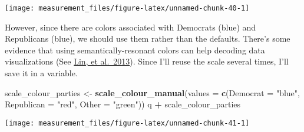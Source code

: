 \documentclass[]{book}
\newenvironment{Shaded}{\begin{snugshade}}{\end{snugshade}}
\newcommand{\CommentTok}[1]{\textcolor[rgb]{0.56,0.35,0.01}{\textit{#1}}}
\newcommand{\DataTypeTok}[1]{\textcolor[rgb]{0.13,0.29,0.53}{#1}}
\newcommand{\DecValTok}[1]{\textcolor[rgb]{0.00,0.00,0.81}{#1}}
\newcommand{\KeywordTok}[1]{\textcolor[rgb]{0.13,0.29,0.53}{\textbf{#1}}}
\newcommand{\NormalTok}[1]{#1}
\newcommand{\OperatorTok}[1]{\textcolor[rgb]{0.81,0.36,0.00}{\textbf{#1}}}
\newcommand{\StringTok}[1]{\textcolor[rgb]{0.31,0.60,0.02}{#1}}
\theoremstyle{definition}
\theoremstyle{definition}
\theoremstyle{definition}
\theoremstyle{remark}
\begin{document}
\begin{center}\texttt{[image: measurement\_files/figure-latex/unnamed-chunk-40-1]} \end{center}

However, since there are colors associated with Democrats (blue) and
Republicans (blue), we should use them rather than the defaults. There's
some evidence that using semantically-resonant colors can help decoding
data visualizations (See
\href{http://vis.stanford.edu/files/2013-SemanticColor-EuroVis.pdf}{Lin,
et al.~2013}). Since I'll reuse the scale several times, I'll save it in
a variable.

\begin{Shaded}
\begin{Highlighting}[]
\NormalTok{scale_colour_parties <-}
\StringTok{  }\KeywordTok{scale_colour_manual}\NormalTok{(}\DataTypeTok{values =} \KeywordTok{c}\NormalTok{(}\DataTypeTok{Democrat =} \StringTok{"blue"}\NormalTok{,}
                                 \DataTypeTok{Republican =} \StringTok{"red"}\NormalTok{,}
                                 \DataTypeTok{Other =} \StringTok{"green"}\NormalTok{))}
\NormalTok{q }\OperatorTok{+}\StringTok{ }\NormalTok{scale_colour_parties}
\end{Highlighting}
\end{Shaded}

\begin{center}\texttt{[image: measurement\_files/figure-latex/unnamed-chunk-41-1]} \end{center}

\begin{Shaded}
\end{Shaded}
\end{document}
